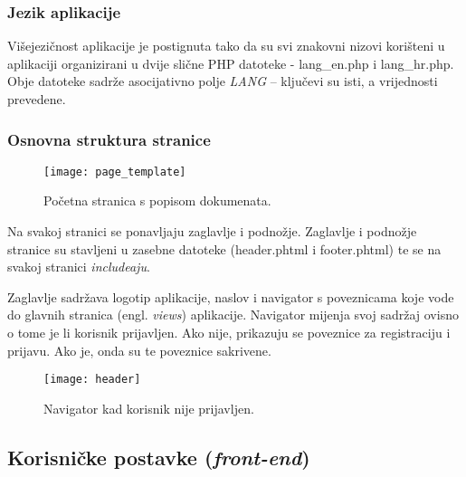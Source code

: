       

      \subsubsection{Jezik aplikacije}

        Višejezičnost aplikacije je postignuta tako da su svi znakovni nizovi
        korišteni u aplikaciji organizirani u dvije slične PHP datoteke -
        lang\_en.php i lang\_hr.php. Obje datoteke sadrže asocijativno polje
        \textit{LANG} -- ključevi su isti, a vrijednosti prevedene.

        

        

    \subsubsection{Osnovna struktura stranice}

    \begin{figure}[h]
      \texttt{[image: page\_template]}
      \caption{Početna stranica s popisom dokumenata.}
    \end{figure}

    Na svakoj stranici se ponavljaju zaglavlje i podnožje. Zaglavlje i podnožje
    stranice su stavljeni u zasebne datoteke (header.phtml i footer.phtml) te se
    na svakoj stranici \textit{includeaju}.

    Zaglavlje sadržava logotip aplikacije, naslov i navigator s poveznicama koje
    vode do glavnih stranica (engl. \textit{views}) aplikacije. Navigator
    mijenja svoj sadržaj ovisno o tome je li korisnik prijavljen. Ako nije,
    prikazuju se poveznice za registraciju i prijavu. Ako je, onda su te
    poveznice sakrivene.

    \begin{figure}[h]
      \centering
      \texttt{[image: header]}
      \caption{Navigator kad korisnik nije prijavljen.}
    \end{figure}

    \subsection{Korisničke postavke (\textit{front-end})}

